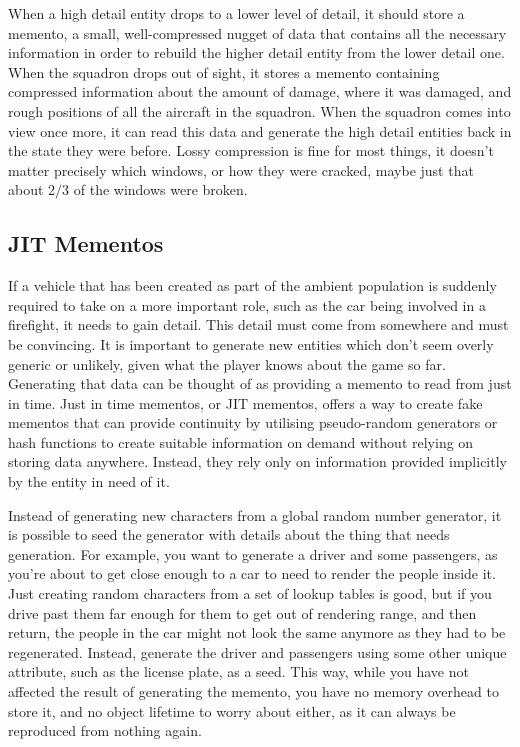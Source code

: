 \documentclass[a4paper,12pt]{article}
\begin{document}
When a high detail entity drops to a lower level of detail, it should store a memento, a small, well-compressed nugget of data that contains all the necessary information in order to rebuild the higher detail entity from the lower detail one.
When the squadron drops out of sight, it stores a memento containing compressed information about the amount of damage, where it was damaged, and rough positions of all the aircraft in the squadron.
When the squadron comes into view once more, it can read this data and generate the high detail entities back in the state they were before.
Lossy compression is fine for most things, it doesn't matter precisely which windows, or how they were cracked, maybe just that about $2/3$ of the windows were broken.

\subsection{JIT Mementos}

If a vehicle that has been created as part of the ambient population is suddenly required to take on a more important role, such as the car being involved in a firefight, it needs to gain detail.
This detail must come from somewhere and must be convincing.
It is important to generate new entities which don't seem overly generic or unlikely, given what the player knows about the game so far.
Generating that data can be thought of as providing a memento to read from just in time.
Just in time mementos, or JIT mementos, offers a way to create fake mementos that can provide continuity by utilising pseudo-random generators or hash functions to create suitable information on demand without relying on storing data anywhere.
Instead, they rely only on information provided implicitly by the entity in need of it.

Instead of generating new characters from a global random number generator, it is possible to seed the generator with details about the thing that needs generation.
For example, you want to generate a driver and some passengers, as you're about to get close enough to a car to need to render the people inside it.
Just creating random characters from a set of lookup tables is good, but if you drive past them far enough for them to get out of rendering range, and then return, the people in the car might not look the same anymore as they had to be regenerated.
Instead, generate the driver and passengers using some other unique attribute, such as the license plate, as a seed. 
This way, while you have not affected the result of generating the memento, you have no memory overhead to store it, and no object lifetime to worry about either, as it can always be reproduced from nothing again.
\end{document}
